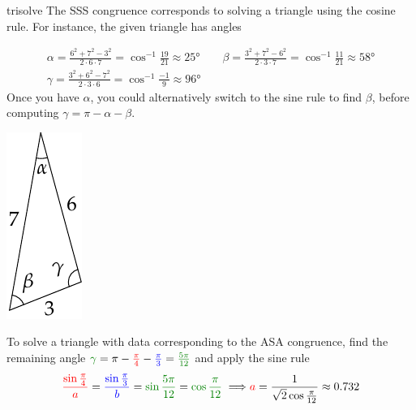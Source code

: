\begin{examples}{}{trisolve}
	\exstart The SSS congruence corresponds to solving a triangle using the cosine rule. For instance, the given triangle has angles
	\begin{enumerate}\setcounter{enumi}{1}
		\begin{minipage}[t]{0.86\linewidth}\vspace{-13pt}
		  \item[]
		  \begin{gather*}
				\alpha=\frac{6^2+7^2-3^2}{2\cdot 6\cdot 7}=\cos^{-1}\frac{19}{21}\approx\ang{25}\qquad
				\beta=\frac{3^2+7^2-6^2}{2\cdot 3\cdot 7}=\cos^{-1}\frac{11}{21}\approx\ang{58}\\[5pt]
				\gamma=\frac{3^2+6^2-7^2}{2\cdot 3\cdot 6}=\cos^{-1}\frac{-1}{9}\approx\ang{96}
			\end{gather*}
			Once you have $\alpha$, you could alternatively switch to the sine rule to find $\beta$, before computing $\gamma=\pi-\alpha-\beta$.
		\end{minipage}\hfill\begin{minipage}[t]{0.13\linewidth}\vspace{-24pt}
			\flushright\includegraphics[scale=0.95]{angles-ssssolve}
		\end{minipage}\smallbreak
		\begin{minipage}[t]{0.75\linewidth}\vspace{0pt}
			\item\label{ex:trisolve2} To solve a triangle with data corresponding to the ASA congruence, find the remaining angle $\textcolor{Green}{\gamma}=\pi-\textcolor{red}{\frac\pi 4}-\textcolor{blue}{\frac\pi 3} =\textcolor{Green}{\frac{5\pi}{12}}$ and apply the sine rule
		  \begin{align*}
		  	\textcolor{red}{\frac{\sin\frac\pi 4}a} =\textcolor{blue}{\frac{\sin\frac\pi 3}b} =\textcolor{Green}{\sin\frac{5\pi}{12}}=\textcolor{Green}{\cos\frac{\pi}{12}} \implies &\textcolor{red}{a}=\frac 1{\sqrt 2\cos\frac{\pi}{12}}\approx 0.732\\

\end{align*}
\end{minipage}
\end{enumerate}
\end{examples}
